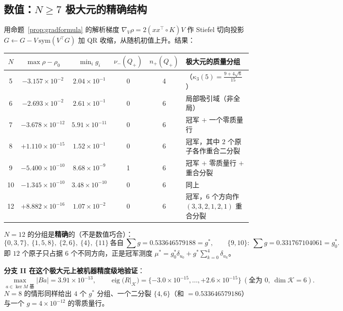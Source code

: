 \documentclass[UTF8,11pt]{ctexart}
\theoremstyle{definition}
\begin{document}
\subsection{数值：$N\ge7$ 极大元的精确结构}\label{sec:r17:num}

用命题~\ref{prop:gradformula} 的解析梯度 $\nabla_V\rho=2(xx^\top\!\circ K)V$ 作 Stiefel 切向投影
$G\leftarrow G-V\,\mathrm{sym}(V^\top G)$ 加 QR 收缩，从随机初值上升。结果：

\begin{center}\small
\begin{tabular}{cccccl}
\hline
$N$ & $\max\rho-\rho_0$ & $\min_ig_i$ & $\nu_-(Q_+)$ & $n_+(Q_+)$ & 极大元的质量分组 \\
\hline
5 & $-3.157\times10^{-2}$ & $2.04\times10^{-1}$ & 0 & 4 & （$\kappa_3(5)=\frac{9+4\sqrt6}{15}$） \\
6 & $-2.693\times10^{-2}$ & $2.61\times10^{-1}$ & 0 & 6 & 局部吸引域（非全局） \\
7 & $-3.678\times10^{-12}$ & $5.91\times10^{-11}$ & 0 & 6 & 冠军 $+$ 一个零质量行 \\
8 & $+1.110\times10^{-15}$ & $1.52\times10^{-1}$ & 0 & 6 & 冠军，其中 $2$ 个原子各作重合二分裂 \\
9 & $-5.400\times10^{-10}$ & $8.68\times10^{-9}$ & 1 & 6 & 冠军 $+$ 零质量行 $+$ 重合分裂 \\
10 & $-1.345\times10^{-10}$ & $3.48\times10^{-10}$ & 0 & 6 & 同上 \\
12 & $+8.882\times10^{-16}$ & $1.07\times10^{-2}$ & 0 & 6 & 冠军，$6$ 个方向作 $(3,3,2,1,2,1)$ 重合分裂 \\
\hline
\end{tabular}
\end{center}

$N=12$ 的分组是\textbf{精确}的（不是数值巧合）：
\[
\{0,3,7\},\ \{1,5,8\},\ \{2,6\},\ \{4\},\ \{11\}\ \text{各自}\ \textstyle\sum g=0.533646579188=g^\ast,
\qquad \{9,10\}:\ \textstyle\sum g=0.331767104061=g_0^\ast .
\]
即 $12$ 个原子只占据 $6$ 个不同方向，正是冠军测度 $\mu^\ast=g_0^\ast\delta_{u_0}+g^\ast\sum_{k=0}^4\delta_{u_k}$。

\textbf{分支 II 在这个极大元上被机器精度级地验证}：
\[
\max_{a\in\ker M\text{ 基}}|Ba|=3.91\times10^{-13},\qquad
\operatorname{eig}\bigl(R|_{\mathcal K}\bigr)=\{-3.0\times10^{-15},\dots,+2.6\times10^{-15}\}\ (\text{全为 }0,\ \dim\mathcal K=6).
\]
$N=8$ 的情形同样给出 $4$ 个 $g^\ast$ 分组、一个二分裂 $\{4,6\}$（和 $=0.533646579186$）
与一个 $g=4\times10^{-12}$ 的零质量行。
\end{document}
